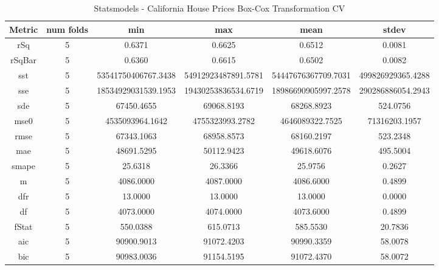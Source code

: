 \documentclass{article}
\begin{document}
\begin{table}[H]
\centering
\caption{Statsmodels - California House Prices Box-Cox Transformation CV}
\label{tab:Statsmodels - House Prices Box-Cox Transformation CV}
\begin{tabular}{|c|c|c|c|c|c|}\hline
Metric & num folds & min & max & mean & stdev \\ \hline \hline
rSq & 5 & 0.6371 & 0.6625 & 0.6512 & 0.0081 \\ \hline
rSqBar & 5 & 0.6360 & 0.6615 & 0.6502 & 0.0082 \\ \hline
sst & 5 & 53541750406767.3438 & 54912923487891.5781 & 54447676367709.7031 & 499826929365.4288 \\ \hline
sse & 5 & 18534929031539.1953 & 19430253836534.6719 & 18986690905997.2578 & 290286886054.2943 \\ \hline
sde & 5 & 67450.4655 & 69068.8193 & 68268.8923 & 524.0756 \\ \hline
mse0 & 5 & 4535093964.1642 & 4755323993.2782 & 4646089322.7525 & 71316203.1957 \\ \hline
rmse & 5 & 67343.1063 & 68958.8573 & 68160.2197 & 523.2348 \\ \hline
mae & 5 & 48691.5295 & 50112.9423 & 49618.6076 & 495.5004 \\ \hline
smape & 5 & 25.6318 & 26.3366 & 25.9756 & 0.2627 \\ \hline
m & 5 & 4086.0000 & 4087.0000 & 4086.6000 & 0.4899 \\ \hline
dfr & 5 & 13.0000 & 13.0000 & 13.0000 & 0.0000 \\ \hline
df & 5 & 4073.0000 & 4074.0000 & 4073.6000 & 0.4899 \\ \hline
fStat & 5 & 550.0388 & 615.0713 & 585.5530 & 20.7836 \\ \hline
aic & 5 & 90900.9013 & 91072.4203 & 90990.3359 & 58.0078 \\ \hline
bic & 5 & 90983.0036 & 91154.5195 & 91072.4370 & 58.0072 \\ \hline
\end{tabular}
\end{table}
\end{document}
